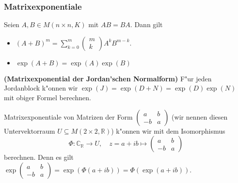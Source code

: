 \documentclass[8pt, a4paper, twocolumn, landscape]{article}
\newcommand{\comment}[1]{}
\begin{document}
 \comment{
 \begin{remark} \bt{Rechenverfahren zur Bestimmung der Basis der rellen Jordanschen Normalform}
\item F"ur die Eigenwerte geht man vor wie im Rechenverfahren zur allgemeinen Jordanschen Normalform beschrieben.
\item F"ur die quadratischen Faktoren geht man so vor: Faktorisiere die irreduziblen Faktoren $(g_j)^{q_j} = (t-\mu_j)^{q_j} (t-\overline{\mu}_j)^{q_j}= $ "uber $\mathbb{C}$ und finde eine Basis zu dem Hauptraum $\mathrm{Hau}(F, \mu_j)$ so wie in der allgemeinen Jordan'schen Normalform. Sei $v \in \mathbb{C}^n$ ein zyklischer Vektor eines Jordanblocks der Gr"osse $s$. 
 
 \end{remark}
 }


\subsubsection{Matrixexponentiale}
\begin{lemma}
Seien $A, B \in M(n \times n, K)$ mit $AB = BA$. Dann gilt
\begin{itemize}
\item $
(A+B)^m = \sum\limits_{k = 0}^m \left( \begin{array}{c}m \\ k
\end{array}\right) A^k B^{m-k} .
$
\item $
\exp (A + B) = \exp (A) \exp (B)
$
\end{itemize}
\end{lemma}

\begin{lemma}
\textbf{(Matrixexponential der Jordan'schen Normalform)}
F"ur jeden Jordanblock k"onnen wir $\exp (J) = \exp (D + N) = \exp (D) \exp (N)$ mit obiger Formel berechnen.

Matrixexponentiale von Matrizen der Form $\left( \begin{array}{cc}
a & b \\ -b & a
\end{array} \right)$ (wir nennen diesen Untervektorraum $U \subseteq M(2 \times 2, \mathbb{R})$) k"onnen wir mit dem Isomorphismus $$\Phi: \mathbb{C}_\mathbb{R} \rightarrow U , \quad z = a + ib \mapsto \left( \begin{array}{cc}
a & b \\ -b & a
\end{array} \right)$$ berechnen. Denn es gilt $\exp \left( \begin{array}{cc}
a & b \\ -b & a
\end{array} \right) = \exp(\Phi(a + ib) ) = \Phi (\exp (a + ib))$.
\end{lemma}
\end{document}
